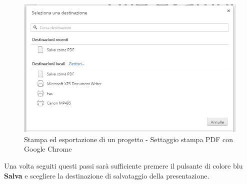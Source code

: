 \begin{figure}[H] 
	\centering 
	\includegraphics[scale=0.40] {img/salvacome}
	\caption{Stampa ed esportazione di un progetto - Settaggio stampa PDF con Google Chrome} 
\end{figure}

\noindent Una volta seguiti questi passi sarà sufficiente premere il pulsante di colore blu \textbf{Salva} e scegliere la destinazione di salvataggio della presentazione. 